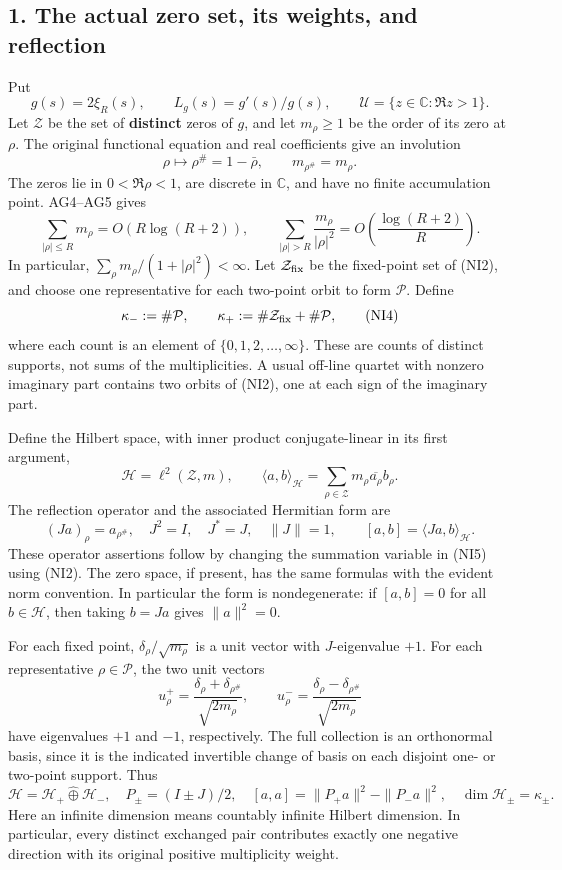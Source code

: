\documentclass[
  10pt,
  a4paper,
]{article}
\begin{document}
\subsection{1. The actual zero set, its weights, and
reflection}\label{the-actual-zero-set-its-weights-and-reflection}

Put \[
g(s)=2\xi_R(s),\qquad L_g(s)=g'(s)/g(s),\qquad
\mathcal U=\{z\in\mathbb C:\Re z>1\}.
\tag{NI1}
\] Let \(\mathcal Z\) be the set of \textbf{distinct} zeros of \(g\),
and let \(m_\rho\ge1\) be the order of its zero at \(\rho\). The
original functional equation and real coefficients give an involution \[
\rho\longmapsto\rho^\#=1-\bar\rho,\qquad
m_{\rho^\#}=m_\rho.
\tag{NI2}
\] The zeros lie in \(0<\Re\rho<1\), are discrete in \(\mathbb C\), and
have no finite accumulation point. AG4--AG5 gives \[
\sum_{|\rho|\le R}m_\rho=O(R\log(R+2)),\qquad
\sum_{|\rho|>R}\frac{m_\rho}{|\rho|^2}
=O\left(\frac{\log(R+2)}R\right).
\tag{NI3}
\] In particular, \(\sum_\rho m_\rho/(1+|\rho|^2)<\infty\). Let
\(\mathcal Z_{\rm fix}\) be the fixed-point set of (NI2), and choose one
representative for each two-point orbit to form \(\mathcal P\). Define
\[
\kappa_-:=\#\mathcal P,\qquad
\kappa_+:=\#\mathcal Z_{\rm fix}+\#\mathcal P,
\tag{NI4}
\] where each count is an element of \(\{0,1,2,\ldots,\infty\}\). These
are counts of distinct supports, not sums of the multiplicities. A usual
off-line quartet with nonzero imaginary part contains two orbits of
(NI2), one at each sign of the imaginary part.

Define the Hilbert space, with inner product conjugate-linear in its
first argument, \[
\mathcal H=\ell^2(\mathcal Z,m),\qquad
\langle a,b\rangle_{\mathcal H}
=\sum_{\rho\in\mathcal Z}m_\rho\overline{a_\rho}b_\rho.
\tag{NI5}
\] The reflection operator and the associated Hermitian form are \[
(Ja)_\rho=a_{\rho^\#},\quad J^2=I,
\quad J^*=J,\quad \|J\|=1,
\qquad [a,b]=\langle Ja,b\rangle_{\mathcal H}.
\tag{NI6}
\] These operator assertions follow by changing the summation variable
in (NI5) using (NI2). The zero space, if present, has the same formulas
with the evident norm convention. In particular the form is
nondegenerate: if \([a,b]=0\) for all \(b\in\mathcal H\), then taking
\(b=Ja\) gives \(\|a\|^2=0\).

For each fixed point, \(\delta_\rho/\sqrt{m_\rho}\) is a unit vector
with \(J\)-eigenvalue \(+1\). For each representative
\(\rho\in\mathcal P\), the two unit vectors \[
u_\rho^+=\frac{\delta_\rho+\delta_{\rho^\#}}{\sqrt{2m_\rho}},
\qquad
u_\rho^-=\frac{\delta_\rho-\delta_{\rho^\#}}{\sqrt{2m_\rho}}
\tag{NI7}
\] have eigenvalues \(+1\) and \(-1\), respectively. The full collection
is an orthonormal basis, since it is the indicated invertible change of
basis on each disjoint one- or two-point support. Thus \[
\mathcal H=\mathcal H_+\mathbin{\widehat\oplus}\mathcal H_-,
\quad P_\pm=(I\pm J)/2,
\quad [a,a]=\|P_+a\|^2-\|P_-a\|^2,
\quad \dim\mathcal H_\pm=\kappa_\pm.
\tag{NI8}
\] Here an infinite dimension means countably infinite Hilbert
dimension. In particular, every distinct exchanged pair contributes
exactly one negative direction with its original positive multiplicity
weight.
\end{document}
